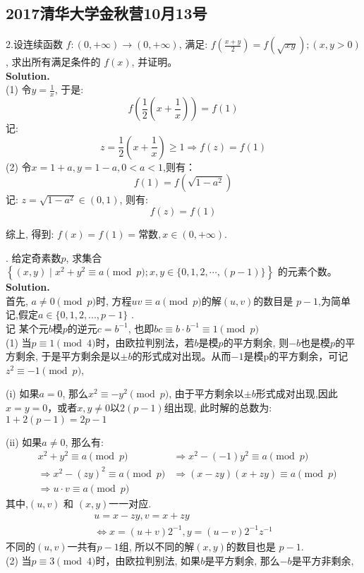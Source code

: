 \documentclass[UTF8]{article}
\begin{document}
\newpage
\subsection{2017清华大学金秋营10月13号}
\noindent 2.设连续函数 $f: (0,+\infty) \longrightarrow (0,+\infty)$, 满足: $f(\frac{x+y}{2}) = f(\sqrt{xy}); (x,y>0)$ , 求出所有满足条件的 $f(x)$, 并证明。\\
\textbf{Solution.} \\
(1) 令$y=\frac{1}{x}$, 于是:
$$f\left (\frac{1}{2}(x+\frac{1}{x})\right) = f(1)$$
记: 
$$z=\frac{1}{2}(x+\frac{1}{x}) \ge 1 \Longrightarrow f(z) = f(1) $$
(2) 令$x=1+a,y=1-a , 0<a<1$,则有：
$$f(1) = f(\sqrt{1-a^2})$$
记:  $z=\sqrt{1-a^2} \in (0,1)$, 则有:
$$f(z) = f(1)$$

综上, 得到: $f(x)=f(1) = \text{常数}, x\in (0,+\infty).$


. 给定奇素数$p$, 求集合$\left\{(x,y)\mid x^2+y^2 \equiv a \pmod{p}; x,y\in \{0,1,2,\cdots ,(p-1)\} \right\}$ 的元素个数。
\\
\textbf{Solution.} \\
首先, $a \ne 0 \pmod p$时, 方程$uv\equiv a \pmod p $的解$(u,v)$的数目是 $p-1$,为简单记,假定$a\in\{0,1,2,...,p-1\}$ .\\
记 某个元$b$模$p$的逆元$c=b^{-1}$, 也即$bc\equiv b\cdot b^{-1}\equiv1\pmod{p}$\\
(1) 当$p\equiv1 \pmod{4}$时，由欧拉判别法，若$b$是模$p$的平方剩余, 则$-b$也是模$p$的平方剩余, 于是平方剩余是以$\pm b$的形式成对出现。从而$-1$是模p的平方剩余，可记$z^2\equiv -1 \pmod{p}$, 

(i) 如果$a = 0 $, 那么$x^2\equiv -y^2 \pmod{p}$, 由于平方剩余以$\pm b$形式成对出现,因此$x=y=0$，或者$x,y\ne 0$以$2(p-1)$组出现,
此时解的总数为: $1+2(p-1)=2p-1$

(ii) 如果$a\ne 0 $, 那么有:
\begin{eqnarray*}
	&x^2+y^2 \equiv a \pmod{p} & \Longrightarrow x^2 - (-1)y^2 \equiv a \pmod{p}\\
	&\Longrightarrow x^2 - (zy)^2 \equiv a \pmod{p} & \Longrightarrow (x-zy)(x+zy) \equiv a \pmod{p}\\
	&\Longrightarrow u\cdot v \equiv a \pmod{p}
\end{eqnarray*}
其中,$(u,v)$ 和 $(x,y)$一一对应.
\begin{eqnarray*}
	u=x-zy,v=x+zy \\
	\Longleftrightarrow x=(u+v)2^{-1}, y=(u-v)2^{-1}z^{-1}
\end{eqnarray*}
不同的$(u,v)$一共有$p-1$组, 所以不同的解$(x,y)$的数目也是 $p-1$.
\\
(2) 当$p\equiv3 \pmod{4}$时，由欧拉判别法, 如果$b$是平方剩余, 那么$-b$是平方非剩余,
\end{document}
